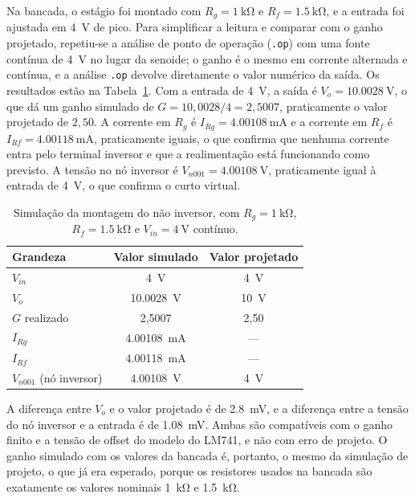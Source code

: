 \documentclass[11pt,a4paper]{article}
\begin{document}
Na bancada, o estágio foi montado com $R_g = \SI{1}{\kilo\ohm}$ e $R_f = \SI{1,5}{\kilo\ohm}$, e a entrada foi ajustada em \SI{4}{\volt} de pico. Para simplificar a leitura e comparar com o ganho projetado, repetiu-se a análise de ponto de operação (\texttt{.op}) com uma fonte contínua de \SI{4}{\volt} no lugar da senoide; o ganho é o mesmo em corrente alternada e contínua, e a análise \texttt{.op} devolve diretamente o valor numérico da saída. Os resultados estão na Tabela~\ref{tab:nao_inv_sim_bancada}. Com a entrada de \SI{4}{\volt}, a saída é $V_o = \SI{10,0028}{\volt}$, o que dá um ganho simulado de $G = 10{,}0028/4 = 2{,}5007$, praticamente o valor projetado de $2{,}50$. A corrente em $R_g$ é $I_{Rg} = \SI{4,00108}{\milli\ampere}$ e a corrente em $R_f$ é $I_{Rf} = \SI{4,00118}{\milli\ampere}$, praticamente iguais, o que confirma que nenhuma corrente entra pelo terminal inversor e que a realimentação está funcionando como previsto. A tensão no nó inversor é $V_{n001} = \SI{4,00108}{\volt}$, praticamente igual à entrada de \SI{4}{\volt}, o que confirma o curto virtual.

\begin{table}[h]
\centering
\caption{Simulação da montagem do não inversor, com $R_g = \SI{1}{\kilo\ohm}$, $R_f = \SI{1,5}{\kilo\ohm}$ e $V_{in} = \SI{4}{\volt}$ contínuo.}
\label{tab:nao_inv_sim_bancada}
\begin{tabular}{lcc}
\hline
Grandeza & Valor simulado & Valor projetado \\
\hline
$V_{in}$ & \SI{4}{\volt} & \SI{4}{\volt} \\
$V_o$ & \SI{10,0028}{\volt} & \SI{10}{\volt} \\
$G$ realizado & 2,5007 & 2,50 \\
$I_{Rg}$ & \SI{4,00108}{\milli\ampere} & --- \\
$I_{Rf}$ & \SI{4,00118}{\milli\ampere} & --- \\
$V_{n001}$ (nó inversor) & \SI{4,00108}{\volt} & \SI{4}{\volt} \\
\hline
\end{tabular}
\end{table}

A diferença entre $V_o$ e o valor projetado é de \SI{2,8}{\milli\volt}, e a diferença entre a tensão do nó inversor e a entrada é de \SI{1,08}{\milli\volt}. Ambas são compatíveis com o ganho finito e a tensão de offset do modelo do LM741, e não com erro de projeto. O ganho simulado com os valores da bancada é, portanto, o mesmo da simulação de projeto, o que já era esperado, porque os resistores usados na bancada são exatamente os valores nominais \SI{1}{\kilo\ohm} e \SI{1,5}{\kilo\ohm}.
\end{document}
